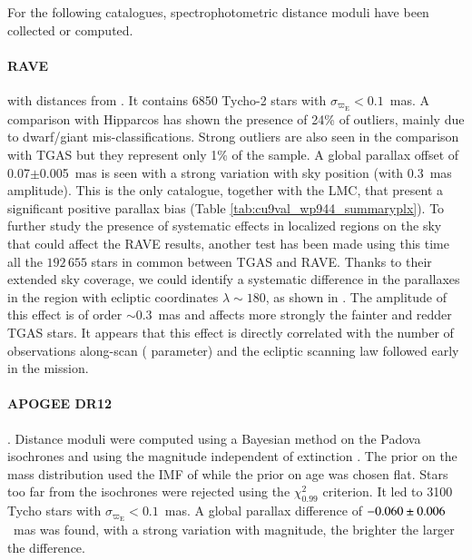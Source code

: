 For the following catalogues, spectrophotometric distance moduli have been collected or computed. 
\paragraph{RAVE} \citep{2013AJ....146..134K} with distances from \citet{Binney2014MNRAS.437..351B}. 
It contains 6850 Tycho-2 stars with $\sigma_{\varpi_\mathrm{E}}<0.1$~mas. A comparison with Hipparcos has shown the presence of 24\% of outliers, mainly due to dwarf/giant mis-classifications. 
Strong outliers are also seen in the comparison with TGAS but they represent only 1\% of the sample. A global parallax offset of 0.07$\pm$0.005~mas is seen with a strong variation with sky position (with 0.3~mas amplitude). 
This is the only catalogue, together with the LMC, that present a significant positive parallax bias (Table \ref{tab:cu9val_wp944_summaryplx}). 
To further study the presence of systematic effects in localized regions on the sky that could affect the RAVE results, another test has been made using this time all the $192\,655$ stars in common between TGAS and RAVE.  
Thanks to their extended sky coverage, we could identify a
systematic difference in the parallaxes in the region with ecliptic
coordinates $\lambda \sim 180${\deg}, as shown in
. The amplitude of this effect is of
order $\sim 0.3$~mas and affects more strongly the fainter and redder
TGAS stars. It appears that this effect is directly correlated with the 
number of observations along-scan ( parameter) 
and the ecliptic scanning law followed early in the mission.


\paragraph{APOGEE DR12} \citep{2015AJ....150..148H}. Distance moduli were computed using a Bayesian method on the Padova isochrones \citep[CMD 2.7]{Bressan12} and using the magnitude independent of extinction \Kjk. The prior on the mass distribution used the IMF of \cite{Chabrier01} while the prior on age was chosen flat. Stars too far from the isochrones were rejected using the $\chi^2_{0.99}$ criterion. It led to 3100 Tycho stars with $\sigma_{\varpi_\mathrm{E}}<0.1$~mas. 
  A global parallax difference of $-0.060\pm 0.006$~mas was found, with a strong variation with magnitude, the brighter the larger the difference. 
  
